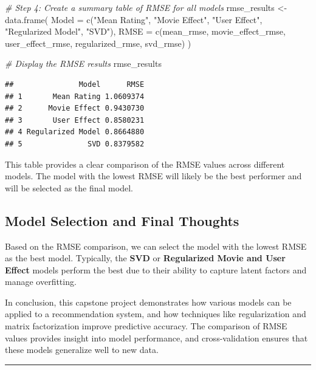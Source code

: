 \documentclass[
]{article}
\newenvironment{Shaded}{}{}
\newcommand{\AttributeTok}[1]{\textcolor[rgb]{0.49,0.56,0.16}{#1}}
\newcommand{\CommentTok}[1]{\textcolor[rgb]{0.38,0.63,0.69}{\textit{#1}}}
\newcommand{\FunctionTok}[1]{\textcolor[rgb]{0.02,0.16,0.49}{#1}}
\newcommand{\NormalTok}[1]{#1}
\newcommand{\OtherTok}[1]{\textcolor[rgb]{0.00,0.44,0.13}{#1}}
\newcommand{\StringTok}[1]{\textcolor[rgb]{0.25,0.44,0.63}{#1}}
\begin{document}
\begin{Shaded}
\begin{Highlighting}[]
\CommentTok{\# Step 4: Create a summary table of RMSE for all models}
\NormalTok{rmse\_results }\OtherTok{\textless{}{-}} \FunctionTok{data.frame}\NormalTok{(}
  \AttributeTok{Model =} \FunctionTok{c}\NormalTok{(}\StringTok{"Mean Rating"}\NormalTok{, }
            \StringTok{"Movie Effect"}\NormalTok{, }
            \StringTok{"User Effect"}\NormalTok{, }
            \StringTok{"Regularized Model"}\NormalTok{, }
            \StringTok{"SVD"}\NormalTok{),}
  \AttributeTok{RMSE =} \FunctionTok{c}\NormalTok{(mean\_rmse, }
\NormalTok{           movie\_effect\_rmse, }
\NormalTok{           user\_effect\_rmse, }
\NormalTok{           regularized\_rmse, }
\NormalTok{           svd\_rmse)}
\NormalTok{)}

\CommentTok{\# Display the RMSE results}
\NormalTok{rmse\_results}
\end{Highlighting}
\end{Shaded}

\begin{verbatim}
##               Model      RMSE
## 1       Mean Rating 1.0609374
## 2      Movie Effect 0.9430730
## 3       User Effect 0.8580231
## 4 Regularized Model 0.8664880
## 5               SVD 0.8379582
\end{verbatim}

This table provides a clear comparison of the RMSE values across
different models. The model with the lowest RMSE will likely be the best
performer and will be selected as the final model.

\subsection{Model Selection and Final
Thoughts}\label{model-selection-and-final-thoughts}

Based on the RMSE comparison, we can select the model with the lowest
RMSE as the best model. Typically, the \textbf{SVD} or
\textbf{Regularized Movie and User Effect} models perform the best due
to their ability to capture latent factors and manage overfitting.

In conclusion, this capstone project demonstrates how various models can
be applied to a recommendation system, and how techniques like
regularization and matrix factorization improve predictive accuracy. The
comparison of RMSE values provides insight into model performance, and
cross-validation ensures that these models generalize well to new data.

\begin{center}\rule{0.5\linewidth}{0.5pt}\end{center}
\end{document}
